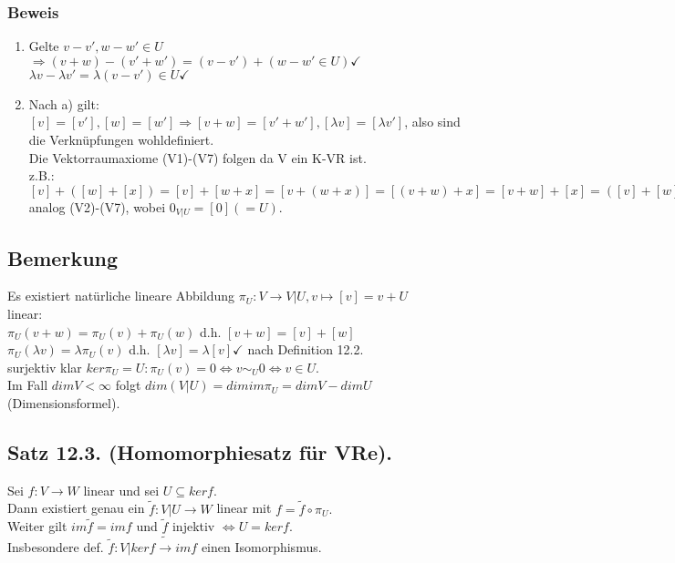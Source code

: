 \documentclass[a4paper, 12pt]{extarticle}
\newcommand{\gdw}{\Leftrightarrow}
\begin{document}
\subsubsection*{Beweis}
\begin{enumerate}[label=\alph*)]
	\item
	Gelte $v-v', w-w' \in U$ \\ 
	$ \Rightarrow (v+w)-(v'+w') = (v-v') + (w-w' \in U) \checkmark$ \\
	$\lambda v - \lambda v' = \lambda (v-v') \in U \checkmark$
	\item
	Nach a) gilt: $[v]=[v'], [w]=[w'] \Rightarrow [v+w] = [v'+w'], [\lambda v] = [\lambda v']$, also sind die Verknüpfungen wohldefiniert. \\
	Die Vektorraumaxiome (V1)-(V7) folgen da V ein K-VR ist. \\
	z.B.: $[v]+([w] + [x]) = [v] + [w+x] = [v+(w+x)] = [(v+w) + x] = [v+w] + [x] = ([v] + [w]) + [x]$ \\
	analog (V2)-(V7), wobei $0_{V|U} = [0] (=U)$.
\end{enumerate}
\subsection*{Bemerkung}
Es existiert natürliche lineare Abbildung $\pi_U: V\to V|U, v\mapsto [v] = v+U$ \\
linear:\\
$\pi_U(v+w) = \pi_U(v) + \pi_U(w)$ d.h. $[v+w] = [v] + [w]$ \\
$\pi_U(\lambda v) = \lambda \pi_U (v)$ d.h. $[\lambda v] = \lambda [v] \checkmark $ nach Definition 12.2. \\
surjektiv klar $ker \pi_U = U: \pi_U(v) = 0 \gdw v\sim_U 0 \gdw v\in U$. \\
Im Fall $dim V < \infty$ folgt $dim(V|U) = dim im \pi_U = dim V - dim U$  (Dimensionsformel).
\subsection*{Satz 12.3. (Homomorphiesatz für VRe).}
Sei $f:V\to W$ linear und sei $U\subseteq ker f$. \\
Dann existiert genau ein $\tilde f: V|U \to W$ linear mit $f = \tilde f \circ \pi_U.$ \\
Weiter gilt $im \tilde f = im f$ und $\tilde f$ injektiv $\gdw U = kerf.$ \\
Insbesondere def. $\tilde f: V|kerf \tilde\to imf$ einen Isomorphismus.
\end{document}
